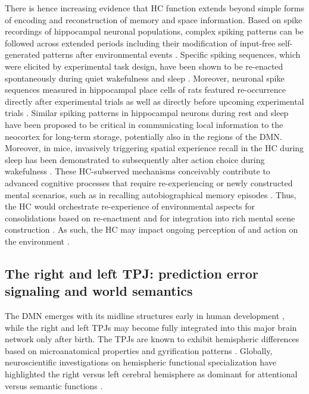 \documentclass[10pt,letterpaper]{article}
\begin{document}
There is hence increasing evidence that
HC function extends beyond simple forms of
encoding and reconstruction of memory and space information.
Based on spike recordings of hippocampal neuronal populations,
complex spiking patterns can be followed across extended periods including
their modification of input-free self-generated patterns
after environmental events \citep{buzsaki2004large}.
Specific spiking sequences, which were elicited by experimental task design,
have been shown to be re-enacted spontaneously during
quiet wakefulness and sleep \citep{hartley2014space, o2010play}.
Moreover, neuronal spike sequences measured in hippocampal place cells of rats
featured re-occurrence directly after experimental trials
as well as directly before upcoming experimental trials \citep{diba2007forward}.
Similar spiking patterns in hippocampal neurons during rest and sleep
have been proposed to be critical in communicating local information
to the neocortex for long-term storage, potentially also in the regions of the DMN.
Moreover, in mice, invasively triggering spatial experience recall
in the HC during sleep
has been demonstrated to subsequently alter action choice during wakefulness
\citep{lavilleon2015}.
These HC-subserved mechanisms
conceivably contribute to advanced cognitive processes that require
re-experiencing or newly constructed mental scenarios,
such as in recalling autobiographical memory episodes
\citep{hassabis2007patients}.
Thus, the HC would orchestrate re-experience of environmental aspects for
consolidations based on re-enactment and for integration into
rich mental scene construction \citep{deuker2016event, bird2010establishing}.
As such, the HC may impact
ongoing perception of and action on the environment
\citep{maguire2016, lavilleon2015}.


\subsection{The right and left TPJ: prediction error signaling and world semantics}
The DMN emerges with its midline structures early in human development
\citep{doria2010}, while
the right and left TPJs may become fully integrated into this major brain
network only after birth.
The TPJs are known to exhibit hemispheric differences
based on microanatomical properties and gyrification patterns
\citep{seghier2013angular}.
Globally, neuroscientific investigations on hemispheric functional specialization
have highlighted the right versus left cerebral hemisphere as dominant for
attentional versus semantic functions
\citep{seghier2013angular, bzdok2013tpj, bzdok2016left,
stephan2007mechanisms}.
\end{document}
